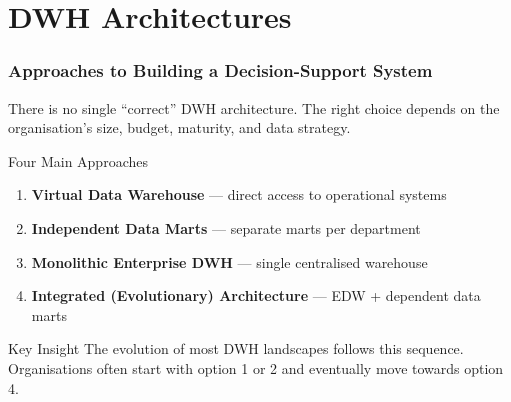 \section{DWH Architectures}


\begin{frame}
  \frametitle{Approaches to Building a Decision-Support System}

  There is no single ``correct'' DWH architecture. The right choice depends
  on the organisation's size, budget, maturity, and data strategy.

  \begin{block}{Four Main Approaches}
    \begin{enumerate}
      \item \textbf{Virtual Data Warehouse} --- direct access to operational systems
      \item \textbf{Independent Data Marts} --- separate marts per department
      \item \textbf{Monolithic Enterprise DWH} --- single centralised warehouse
      \item \textbf{Integrated (Evolutionary) Architecture} --- EDW + dependent data marts
    \end{enumerate}
  \end{block}

  \begin{alertblock}{Key Insight}
    The evolution of most DWH landscapes follows this sequence.
    Organisations often start with option 1 or 2 and eventually move
    towards option 4.
  \end{alertblock}
\end{frame}


